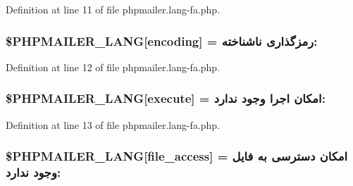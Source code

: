 Definition at line 11 of file phpmailer.\+lang-\/fa.\+php.

\subsubsection[{\texorpdfstring{\$\+P\+H\+P\+M\+A\+I\+L\+E\+R\+\_\+\+L\+A\+NG}{$PHPMAILER_LANG}}]{\setlength{\rightskip}{0pt plus 5cm}\$P\+H\+P\+M\+A\+I\+L\+E\+R\+\_\+\+L\+A\+NG\mbox{[}\textquotesingle{}encoding\textquotesingle{}\mbox{]} = \textquotesingle{}رمزگذاری ناشناخته\+: \textquotesingle{}}\hypertarget{phpmailer_8lang-fa_8php_a817f7283f3d54c970a0c10305cc668cc}{}\label{phpmailer_8lang-fa_8php_a817f7283f3d54c970a0c10305cc668cc}


Definition at line 12 of file phpmailer.\+lang-\/fa.\+php.

\subsubsection[{\texorpdfstring{\$\+P\+H\+P\+M\+A\+I\+L\+E\+R\+\_\+\+L\+A\+NG}{$PHPMAILER_LANG}}]{\setlength{\rightskip}{0pt plus 5cm}\$P\+H\+P\+M\+A\+I\+L\+E\+R\+\_\+\+L\+A\+NG\mbox{[}\textquotesingle{}execute\textquotesingle{}\mbox{]} = \textquotesingle{}امکان اجرا وجود ندارد\+: \textquotesingle{}}\hypertarget{phpmailer_8lang-fa_8php_a668217a9563a168f30f2a8548b6ed5a9}{}\label{phpmailer_8lang-fa_8php_a668217a9563a168f30f2a8548b6ed5a9}


Definition at line 13 of file phpmailer.\+lang-\/fa.\+php.

\subsubsection[{\texorpdfstring{\$\+P\+H\+P\+M\+A\+I\+L\+E\+R\+\_\+\+L\+A\+NG}{$PHPMAILER_LANG}}]{\setlength{\rightskip}{0pt plus 5cm}\$P\+H\+P\+M\+A\+I\+L\+E\+R\+\_\+\+L\+A\+NG\mbox{[}\textquotesingle{}file\+\_\+access\textquotesingle{}\mbox{]} = \textquotesingle{}امکان دسترسی به فایل وجود ندارد\+: \textquotesingle{}}\hypertarget{phpmailer_8lang-fa_8php_a7e83349023b856ef9e5c46e30ae6d51e}{}\label{phpmailer_8lang-fa_8php_a7e83349023b856ef9e5c46e30ae6d51e}


